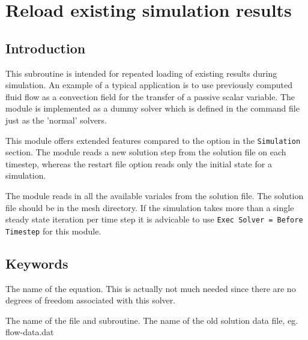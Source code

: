 \chapter{Reload existing simulation results}

\noindent
{}
\begin{versiona}


\section{Introduction}

This subroutine is intended for repeated loading of existing results
during simulation. An example of a typical application is to use
previously computed fluid flow as a convection field for the transfer
of a passive scalar variable. The module is implemented as a dummy
solver which is defined in the command file just as the 'normal'
solvers.

This module offers extended features compared to the \texttt{} option in the \texttt{Simulation} section. The module reads a new
solution step from the solution file on each timestep, whereas the
restart file option reads only the initial state for a simulation.

The module reads in all the available variales from the solution
file. The solution file should be in the mesh directory. If the
simulation takes more than a single steady state iteration per time
step it is advicable to use \texttt{Exec Solver = Before Timestep} for
this module.


\section{Keywords}
\end{versiona}

\sifbegin
{}
\sifbegin
{}
The name of the equation. This is actually not much needed 
since there are no degrees of freedom associated with this solver.

The name of the file and subroutine. 
The name of the old solution data file, eg. flow-data.dat

